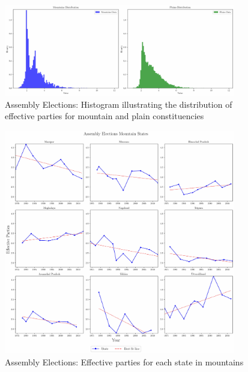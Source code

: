 \begin{figure}[htbp]
    \centering
    \includegraphics[width=0.9\textwidth]{figures/assembly/histogram.pdf}
    \caption{Assembly Elections: Histogram illustrating the distribution of effective parties for mountain and plain constituencies}
\label{img:assembly_histogram}
\end{figure}

\begin{figure}[htbp]
    \centering
    \includegraphics[width=0.9\textwidth]{figures/assembly/assembly_elections_mountain_states.pdf}
    \caption{Assembly Elections:  Effective parties for each state in mountains}
    \label{img:assembly_mountain_enp}
\end{figure}

